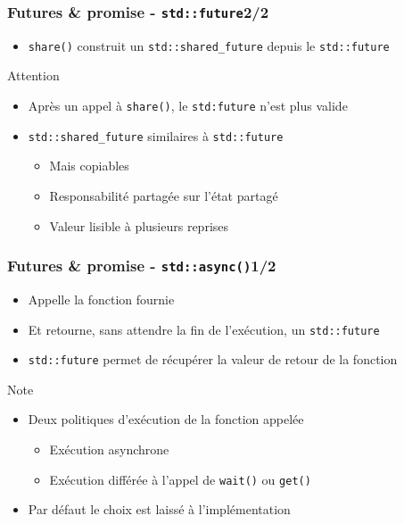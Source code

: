 \documentclass[C++.tex]{subfiles}
\begin{document}
\begin{frame}[fragile]
	\frametitle{Futures \& promise - \lstinline|std::future|\titlehfill{}2/2}
	\begin{itemize}
		\item \lstinline|share()| construit un \lstinline|std::shared_future| depuis le \lstinline|std::future|
	\end{itemize}

	\begin{alertblock}{Attention}
		\begin{itemize}
			\item Après un appel à \lstinline|share()|, le \lstinline|std:future| n'est plus valide
		\end{itemize}
	\end{alertblock}

	\begin{itemize}
		\item \lstinline|std::shared_future| similaires à \lstinline|std::future|
		\begin{itemize}
			\item Mais copiables
			\item Responsabilité partagée sur l'état partagé
			\item Valeur lisible à plusieurs reprises
		\end{itemize}
	\end{itemize}
\end{frame}

\begin{frame}[fragile]
	\frametitle{Futures \& promise - \lstinline|std::async()|\titlehfill{}1/2}
	\begin{itemize}
		\item Appelle la fonction fournie
		\item Et retourne, sans attendre la fin de l'exécution, un \lstinline|std::future|
		\item \lstinline|std::future| permet de récupérer la valeur de retour de la fonction
	\end{itemize}

	\begin{block}{Note}
		\begin{itemize}
			\item Deux politiques d'exécution de la fonction appelée
			\begin{itemize}
				\item Exécution asynchrone
				\item Exécution différée à l'appel de \lstinline|wait()| ou \lstinline|get()|
			\end{itemize}
			\item Par défaut le choix est laissé à l'implémentation
		\end{itemize}
	\end{block}
\end{frame}
\end{document}
